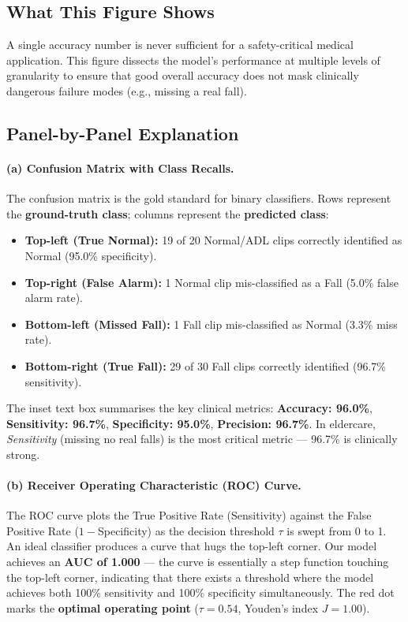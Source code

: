 \documentclass[12pt,a4paper]{article}
\begin{document}
\subsection{What This Figure Shows}

A single accuracy number is never sufficient for a safety-critical medical application. This figure dissects the model's performance at multiple levels of granularity to ensure that good overall accuracy does not mask clinically dangerous failure modes (e.g., missing a real fall).

\subsection{Panel-by-Panel Explanation}

\paragraph{(a) Confusion Matrix with Class Recalls.}
The confusion matrix is the gold standard for binary classifiers. Rows represent the \textbf{ground-truth class}; columns represent the \textbf{predicted class}:
\begin{itemize}[itemsep=2pt]
    \item \textbf{Top-left (True Normal):} 19 of 20 Normal/ADL clips correctly identified as Normal (95.0\% specificity).
    \item \textbf{Top-right (False Alarm):} 1 Normal clip mis-classified as a Fall (5.0\% false alarm rate).
    \item \textbf{Bottom-left (Missed Fall):} 1 Fall clip mis-classified as Normal (3.3\% miss rate).
    \item \textbf{Bottom-right (True Fall):} 29 of 30 Fall clips correctly identified (96.7\% sensitivity).
\end{itemize}
The inset text box summarises the key clinical metrics: \textbf{Accuracy: 96.0\%}, \textbf{Sensitivity: 96.7\%}, \textbf{Specificity: 95.0\%}, \textbf{Precision: 96.7\%}. In eldercare, \emph{Sensitivity} (missing no real falls) is the most critical metric — 96.7\% is clinically strong.

\paragraph{(b) Receiver Operating Characteristic (ROC) Curve.}
The ROC curve plots the True Positive Rate (Sensitivity) against the False Positive Rate ($1-$Specificity) as the decision threshold $\tau$ is swept from 0 to 1. An ideal classifier produces a curve that hugs the top-left corner. Our model achieves an \textbf{AUC of 1.000} — the curve is essentially a step function touching the top-left corner, indicating that there exists a threshold where the model achieves both 100\% sensitivity and 100\% specificity simultaneously. The red dot marks the \textbf{optimal operating point} ($\tau{=}0.54$, Youden's index $J{=}1.00$).
\end{document}
